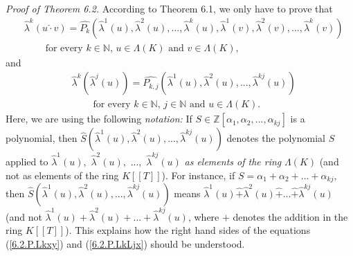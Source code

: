 \documentclass[12pt,final,notitlepage,onecolumn,german]{article}%
\begin{document}
\textit{Proof of Theorem 6.2.} According to Theorem 6.1, we only have to prove
that%
\begin{align}
&  \widehat{\lambda}^{k}\left(  u\widehat{\cdot}v\right)  =\widehat{P_{k}%
}\left(  \widehat{\lambda}^{1}\left(  u\right)  ,\widehat{\lambda}^{2}\left(
u\right)  ,...,\widehat{\lambda}^{k}\left(  u\right)  ,\widehat{\lambda}%
^{1}\left(  v\right)  ,\widehat{\lambda}^{2}\left(  v\right)  ,...,\widehat
{\lambda}^{k}\left(  v\right)  \right) \nonumber\\
&  \ \ \ \ \ \ \ \ \ \ \text{for every }k\in\mathbb{N}\text{, }u\in
\Lambda\left(  K\right)  \text{ and }v\in\Lambda\left(  K\right)  ,
\label{6.2.P.Lkxy}%
\end{align}
and%
\begin{align}
&  \widehat{\lambda}^{k}\left(  \widehat{\lambda}^{j}\left(  u\right)
\right)  =\widehat{P_{k,j}}\left(  \widehat{\lambda}^{1}\left(  u\right)
,\widehat{\lambda}^{2}\left(  u\right)  ,...,\widehat{\lambda}^{kj}\left(
u\right)  \right) \nonumber\\
&  \ \ \ \ \ \ \ \ \ \ \text{for every }k\in\mathbb{N}\text{, }j\in
\mathbb{N}\text{ and }u\in\Lambda\left(  K\right)  . \label{6.2.P.LkLjx}%
\end{align}
Here, we are using the following \textit{notation:} If $S\in\mathbb{Z}\left[
\alpha_{1},\alpha_{2},...,\alpha_{kj}\right]  $ is a polynomial, then
$\widehat{S}\left(  \widehat{\lambda}^{1}\left(  u\right)  ,\widehat{\lambda
}^{2}\left(  u\right)  ,...,\widehat{\lambda}^{kj}\left(  u\right)  \right)  $
denotes the polynomial $S$ applied to $\widehat{\lambda}^{1}\left(  u\right)
,$ $\widehat{\lambda}^{2}\left(  u\right)  ,$ $...,$ $\widehat{\lambda}%
^{kj}\left(  u\right)  $ \textit{as elements of the ring }$\Lambda\left(
K\right)  $ (and not as elements of the ring $K\left[  \left[  T\right]
\right]  $). For instance, if $S=\alpha_{1}+\alpha_{2}+...+\alpha_{kj},$ then
$\widehat{S}\left(  \widehat{\lambda}^{1}\left(  u\right)  ,\widehat{\lambda
}^{2}\left(  u\right)  ,...,\widehat{\lambda}^{kj}\left(  u\right)  \right)  $
means $\widehat{\lambda}^{1}\left(  u\right)  \widehat{+}\widehat{\lambda}%
^{2}\left(  u\right)  \widehat{+}...\widehat{+}\widehat{\lambda}^{kj}\left(
u\right)  $ (and not $\widehat{\lambda}^{1}\left(  u\right)  +\widehat
{\lambda}^{2}\left(  u\right)  +...+\widehat{\lambda}^{kj}\left(  u\right)  $,
where $+$ denotes the addition in the ring $K\left[  \left[  T\right]
\right]  $). This explains how the right hand sides of the equations
(\ref{6.2.P.Lkxy}) and (\ref{6.2.P.LkLjx}) should be understood.
\end{document}
